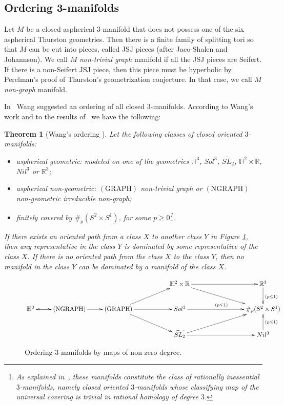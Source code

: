 \documentclass[12pt]{amsart}
\newtheorem{thm}{Theorem}[section]
\theoremstyle{remark}
\begin{document}
\subsection{Ordering 3-manifolds}

Let $M$ be a closed aspherical $3$-manifold that does not possess one of the six aspherical Thurston geometries. Then there is a finite family of splitting tori so that $M$ can be cut into pieces, called JSJ pieces (after Jaco-Shalen and Johannson). We call $M$ {\em non-trivial graph} manifold if all the JSJ pieces are Seifert. If there is a non-Seifert JSJ piece, then this piece must be hyperbolic by Perelman's proof of Thurston's geometrization conjecture. In that case, we call $M$ {\em non-graph} manifold. 

 In~\cite{Wang:3-mfdsasp} Wang suggested an ordering of all closed $3$-manifolds.  According to Wang's work and to the results of~\cite{KotschickNeofytidis} 
 we have the following:

\begin{thm}[Wang's ordering \cite{Wang:3-mfdsasp,KotschickNeofytidis}]\label{t:order3-mfds}
 Let the following classes of closed oriented $3$-manifolds: 
\begin{itemize}
 \item[\normalfont{(i)}] aspherical geometric: modeled on one of the geometries $\mathbb{H}^3$, $Sol^3$, $\widetilde{SL_2}$, $\mathbb{H}^2 \times {\mathbb{R}}$,
$Nil^3$ or ${\mathbb{R}}^3$;
 \item[\normalfont{(ii)}] aspherical non-geometric: $\mathrm{(GRAPH)}$ non-trivial graph or $\mathrm{(NGRAPH)}$ non-geometric irreducible non-graph;
 \item[\normalfont{(iii)}] finitely covered by $\#_p(S^2 \times S^1)$, for some $p\geq 0$\footnote{As explained in~\cite{KotschickNeofytidis}, these manifolds constitute the class of {\em rationally inessential} $3$-manifolds, namely closed oriented $3$-manifolds whose classifying map of the universal covering is trivial in rational homology of degree $3$.}.
\end{itemize}
If there exists an oriented path from a class $X$ to another class $Y$ in Figure \ref{f:order3-mfds}, then any representative in the class $Y$ is dominated
by some representative of the class $X$. If there is no oriented path from the class $X$ to the class $Y$, then no manifold in the class $Y$ can be
dominated by a manifold of the class $X$. 
\end{thm}

\begin{figure}[]
     \[
\xymatrix{
& & & & \mathbb{H}^2 \times {\mathbb{R}} \ar[rrr] \ar[rrrd] & & & {\mathbb{R}}^3 \ar[d]^{(p\leq 1)}\\
\mathbb{H}^3 \ar[r] & \mathrm{(NGRAPH)} \ar[l] \ar[r] &
\mathrm{(GRAPH)} 
\ar[rru] \ar[rrd] \ar[rr] & &
Sol^3 \ar[rrr]^{(p\leq 1)} & & & \#_p(S^2 \times S^1)\\
& & & &\widetilde{SL_2} \ar[rrr] \ar[rrru] & & & Nil^3 \ar[u]_{(p\leq 1)}}
\]
\caption{\small{Ordering $3$-manifolds by maps of non-zero degree.}}
\label{f:order3-mfds}
\end{figure}
\end{document}
